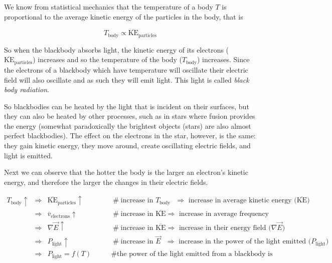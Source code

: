 \documentclass{article}
\theoremstyle{definition}
\begin{document}
\bigskip
\noindent
We know from statistical mechanics that the temperature of a body
$T$ is proportional to the average kinetic energy of the
particles in the body, that is

\begin{equation*}
T_{\text{body}} \propto \overline{\text{KE}}_{\text{particles}}
\end{equation*}

\bigskip
\noindent
So when the blackbody absorbs light, the kinetic energy of its
electrons ($\overline{\text{KE}}_{\text{particles}}$) increases
and so the temperature of the body ($T_{\text{body}}$) increases.
Since the electrons of a blackbody which have temperature will
oscillate their electric field will also oscillate and as such
they will emit light.  This light is called \emph{black body
radiation}.

\bigskip
\noindent
So blackbodies can be heated by the light that is incident on
their surfaces, but they can also be heated by other processes,
such as in stars where fusion provides the energy (somewhat
paradoxically the brightest objects (stars) are also almost
perfect blackbodies).  The effect on the electrons in the star,
however, is the same: they gain kinetic energy, they move around,
create oscillating electric fields, and light is emitted.

\bigskip
\noindent
Next we can observe that the hotter the body is the larger an
electron's kinetic energy, and therefore the larger the changes
in their electric fields.

\begin{equation*}
\begin{array}{llll}
T_{\text{body}} \uparrow  
&\Rightarrow& \overline{\text{KE}}_{\text{particles}} \uparrow
		&\qquad \mathrel{\#} \text{increase in $T_{\text{body}}$ 
		                           $\Rightarrow$ increase in average 
		                           kinetic energy ($\overline{\text{KE}}$)} \\
[5pt]	
&\Rightarrow& \overline{v}_{\text{electrons}} \uparrow
		&\qquad \mathrel{\#} \text{increase in $\overline{\text{KE}} \Rightarrow$ increase in average frequency} \\
[5pt]
&\Rightarrow& \nabla \vec{E} \uparrow
		&\qquad \mathrel{\#} \text{increase in $\overline{\text{KE}} \Rightarrow$ increase in their energy field ($\nabla \vec{E}$)} \\
[5pt]			
&\Rightarrow& P_{\text{light}} \uparrow 
		&\qquad \mathrel{\#} \text{increase in $\vec{E}$ $\Rightarrow$ increase in the power of the light emitted ($P_{\text{light}}$)} \\
[5pt]
&\Rightarrow& P_{\text{light}} = f(T)
		&\qquad \mathrel{\#} \text{the power of the light emitted from a blackbody is a function of its temperature}
\end{array}
\end{equation*}
\end{document}
